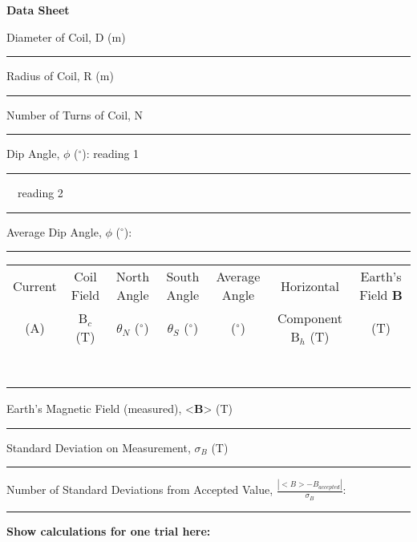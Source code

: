 \newpage

{\centering \textbf{Data Sheet}\par}


Diameter of Coil, D (m)  \rule{2cm}{.1pt}  

Radius of Coil, R (m) \rule{2cm}{.1pt} 

Number of Turns of Coil, N  \rule{2cm}{.1pt}

Dip Angle, \( \phi  \) (\( ^{\circ } \)): reading 1 \rule{1cm}{.1pt}
~~reading 2 \rule{1cm}{.1pt}

Average Dip Angle, \( \phi  \) (\( ^{\circ } \)): \rule{2cm}{.1pt}

\vspace{0.3cm}
{\centering \begin{tabular}{|c|c|c|c|c|c|c|}
\hline 
Current  &
Coil Field &
North Angle &
South Angle &
Average Angle &
Horizontal &
Earth's Field \textbf{B} \\
(A)&
B\( _{c} \) (T)&
\( \theta  \)\( _{N} \) (\( ^{\circ } \))&
\( \theta  \)\( _{S} \) (\( ^{\circ } \))&
(\( ^{\circ } \))&
Component B\( _{h} \) (T)&
(T)\\
\hline 
&
&
&
&
&
&
\\
\hline 
&
&
&
&
&
&
\\
\hline 
&
&
&
&
&
&
\\
\hline 
&
&
&
&
&
&
\\
\hline 
&
&
&
&
&
&
\\
\hline 
&
&
&
&
&
&
\\
\hline 
&
&
&
&
&
&
\\
\hline 
&
&
&
&
&
&
\\
\hline
\end{tabular}\par}
\vspace{0.3cm}

\vspace{15mm}
Earth's Magnetic Field (measured), <\textbf{B}> (T) \rule{2cm}{.1pt}

Standard Deviation on Measurement, \( \sigma _{B} \) (T) \rule{2cm}{.1pt}

Number of Standard Deviations from Accepted Value, \( \frac{\left| <B>-B_{accepted}\right| }{\sigma _{B}} \):
\rule{2cm}{.1pt} 

\textbf{Show calculations for one trial here:}
